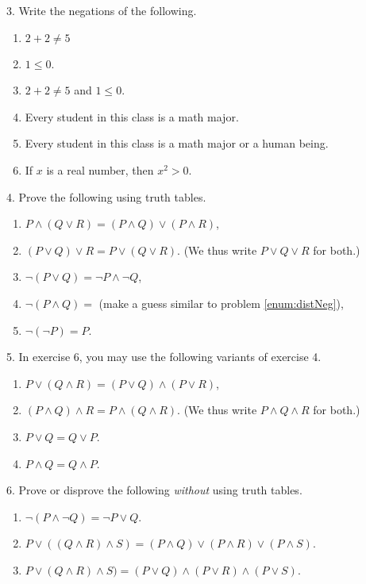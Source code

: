 \documentclass[12pt, reqno]{amsart}
\begin{document}
3. Write the negations of the following.
\vspace{10pt}
\begin{enumerate}
\item $2 + 2 \not = 5$
\item $1  \leq 0$.
\item $2 + 2 \not = 5$ and  $1  \leq 0$.
\item Every student in this class is a math major.
\item Every student in this class is a math major or a human being.
\item If $x$ is a real number, then $x^2 > 0$.
\end{enumerate}
\vspace{20pt}

4. Prove the following using truth tables.
\vspace{10pt}
\begin{enumerate}
\item $P \wedge(  Q\vee R) = (P\wedge Q) \vee (P \wedge R)$,
\item $(P \vee Q) \vee R = P \vee (Q \vee R)$. (We thus write $P \vee Q \vee R$ for both.)
\item \label{enum:distNeg} $\neg (P \vee Q) = \neg P \wedge \neg Q$,
\item $\neg (P \wedge Q) =$ (make a guess similar to problem \ref{enum:distNeg}),
\item $\neg (\neg P) = P$.
\end{enumerate}
\vspace{20pt}

\newpage

5. In exercise 6, you may use the following variants of exercise 4.
\vspace{10pt}
\begin{enumerate}
\item $P \vee(  Q\wedge R) = (P\vee Q) \wedge (P \vee R)$,
\item $(P \wedge Q) \wedge R = P \wedge (Q \wedge R)$. (We thus write $P \wedge Q \wedge R$ for both.)
\item $P \vee Q = Q \vee P$.
\item $P \wedge Q = Q \wedge P$.
\end{enumerate}
\vspace{20pt}

6. Prove or disprove the following \emph{without} using truth tables. 
\vspace{10pt}
\begin{enumerate}
\item $\neg(P \wedge \neg Q) = \neg P \vee Q$.
\item $P \vee ((Q \wedge R) \wedge S) = (P \wedge Q) \vee (P \wedge R)
  \vee (P \wedge S)$.
\item $P \vee (Q \wedge R) \wedge S) = (P \vee Q) \wedge (P \vee R)
  \wedge (P \vee S)$.

\end{enumerate}
\vspace{20pt}
\end{document}

